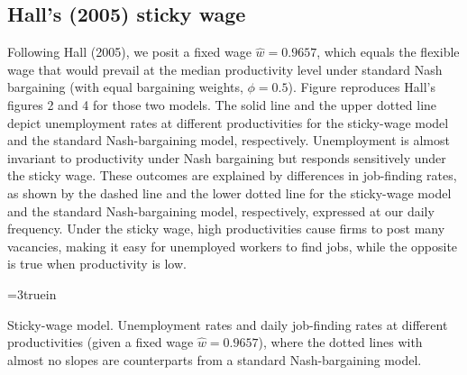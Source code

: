 \subsection{Hall's (2005) sticky wage}\label{sec:FS_Hall_simul}%
Following  Hall (2005),  we posit a
fixed wage $\hat w = 0.9657$, which  equals the flexible wage that
would prevail at the median productivity level under standard Nash
bargaining (with equal bargaining weights, $\phi=0.5$).
Figure  reproduces Hall's figures 2 and 4
for those two models. The solid line and the upper dotted line
depict unemployment rates at different productivities for the
sticky-wage model and the standard Nash-bargaining model,
respectively.
Unemployment is almost invariant to productivity under Nash bargaining
but responds sensitively under the sticky wage. These outcomes are
explained by differences in job-finding rates, as shown by the
dashed line and the lower dotted line for the
sticky-wage model and the standard Nash-bargaining model,
respectively, expressed at our daily frequency.
Under the sticky wage, high productivities cause firms to post many
vacancies, making it easy for unemployed workers to find
jobs, while the opposite is true when productivity is low.

\centerline{\epsfxsize=3truein}
\caption{Sticky-wage model. Unemployment rates and daily job-finding
rates at different productivities (given a fixed wage $\hat w = 0.9657$),
where the dotted lines with almost no slopes are counterparts from
a standard Nash-bargaining model.}
\endfigure

